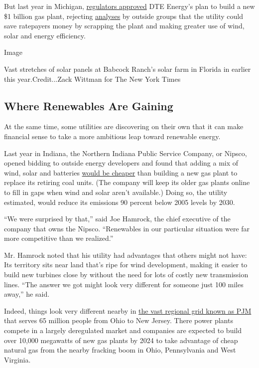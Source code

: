 But last year in Michigan,
\href{https://www.bridgemi.com/michigan-environment-watch/michigan-approves-1b-dte-natural-gas-plant-blow-environmentalists}{regulators
approved} DTE Energy's plan to build a new \$1 billion gas plant,
rejecting
\href{https://blog.ucsusa.org/sam-gomberg/dte-customers-could-save-340-million-with-clean-energy-compared-to-proposed-gas-plant}{analyses}
by outside groups that the utility could save ratepayers money by
scrapping the plant and making greater use of wind, solar and energy
efficiency.

Image

Vast stretches of solar panels at Babcock Ranch's solar farm in Florida
in earlier this year.Credit...Zack Wittman for The New York Times

\hypertarget{where-renewables-are-gaining}{%
\subsection{Where Renewables Are
Gaining}\label{where-renewables-are-gaining}}

At the same time, some utilities are discovering on their own that it
can make financial sense to take a more ambitious leap toward renewable
energy.

Last year in Indiana, the Northern Indiana Public Service Company, or
Nipsco, opened bidding to outside energy developers and found that
adding a mix of wind, solar and batteries
\href{https://www.nipsco.com/docs/librariesprovider11/rates-and-tariffs/irp/irp-executive-summary.pdf?sfvrsn=9}{would
be cheaper} than building a new gas plant to replace its retiring coal
units. (The company will keep its older gas plants online to fill in
gaps when wind and solar aren't available.) Doing so, the utility
estimated, would reduce its emissions 90 percent below 2005 levels by
2030.

``We were surprised by that,'' said Joe Hamrock, the chief executive of
the company that owns the Nipsco. ``Renewables in our particular
situation were far more competitive than we realized.''

Mr. Hamrock noted that his utility had advantages that others might not
have: Its territory sits near land that's ripe for wind development,
making it easier to build new turbines close by without the need for
lots of costly new transmission lines. ``The answer we got might look
very different for someone just 100 miles away,'' he said.

Indeed, things look very different nearby in
\href{https://www.pjm.com/}{the vast regional grid known as PJM} that
serves 65 million people from Ohio to New Jersey. There power plants
compete in a largely deregulated market and companies are expected to
build over 10,000 megawatts of new gas plants by 2024 to take advantage
of cheap natural gas from the nearby fracking boom in Ohio, Pennsylvania
and West Virginia.

